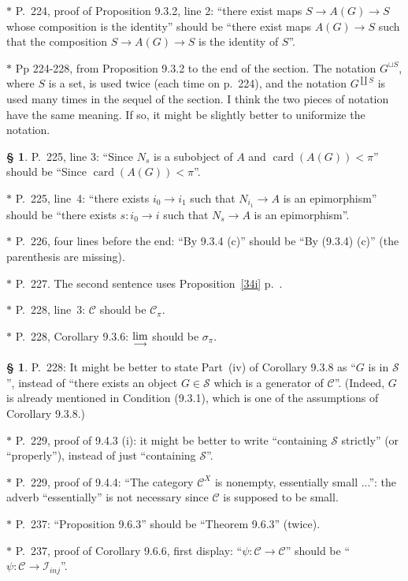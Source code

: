 \documentclass[12pt]{article}%
\theoremstyle{remark}
\theoremstyle{definition}
\newtheorem{s}[thm]{\S}%
\newcommand{\nn}{\noindent}
\newcommand{\cc}{\mathcal}
\newcommand{\C}{\mathcal C}
\newcommand{\ilim}{\operatornamewithlimits{\underset{\longrightarrow}{lim}}}
\DeclareMathOperator{\card}{card}%
\begin{document}
\nn$*$ P.~224, proof of Proposition 9.3.2, line 2: ``there exist maps $S\to A(G)\to S$ whose composition is the identity'' should be ``there exist maps $A(G)\to S$ such that the composition $S\to A(G)\to S$ is the identity of $S$''.

\nn$*$ Pp 224-228, from Proposition 9.3.2 to the end of the section. The notation $G^{\sqcup S}$, where $S$ is a set, is used twice (each time on p.~224), and the notation $G^{\coprod S}$ is used many times in the sequel of the section. I think the two pieces of notation have the same meaning. If so, it might be slightly better to uniformize the notation.

\begin{s}\label{225}
P.~225, line 3: ``Since $N_s$ is a subobject of $A$ and $\card(A(G))<\pi$'' should be ``Since $\card(A(G))<\pi$''.

\nn$*$ P.~225, line~4: ``there exists $i_0\to i_1$ such that $N_{i_1}\to A$ is an epimorphism'' should be ``there exists $s:i_0\to i$ such that $N_s\to A$ is an epimorphism''.
\end{s}

\nn$*$ P.~226, four lines before the end: ``By 9.3.4 (c)'' should be ``By (9.3.4) (c)'' (the parenthesis are missing).

\nn$*$ P.~227. The second sentence uses Proposition~\ref{34i} p.~\pageref{34i}.

\nn$*$ P.~228, line~3: $\C$ should be $\C_\pi$.

\nn$*$ P.~228, Corollary 9.3.6: $\ilim$ should be $\sigma_\pi$.

\begin{s}\label{228}
P.~228: It might be better to state Part~(iv) of Corollary 9.3.8 as ``$G$ is in $\cc S$'', instead of ``there exists an object $G\in\cc S$ which is a generator of $\C$''. (Indeed, $G$ is already mentioned in Condition (9.3.1), which is one of the assumptions of Corollary 9.3.8.)
\end{s}

\nn$*$ P.~229, proof of 9.4.3 (i): it might be better to write ``containing $\mathcal S$ strictly'' (or ``properly''), instead of just ``containing $\mathcal S$''. 

\nn$*$ P.~229, proof of 9.4.4: ``The category $\C^X$ is nonempty, essentially small ...'': the adverb ``essentially'' is not necessary since $\C$ is supposed to be small.

\nn$*$ P.~237: ``Proposition 9.6.3'' should be ``Theorem 9.6.3'' (twice). 

\nn$*$ P.~237, proof of Corollary 9.6.6, first display: ``$\psi:\C\to\C$'' should be ``$\psi:\C\to\mathcal I_{inj}$''. 
\end{document}
